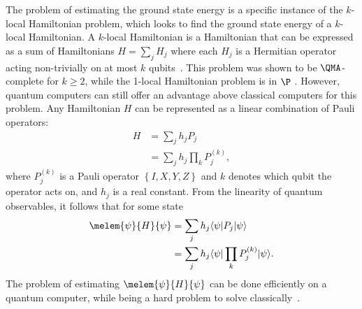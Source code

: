 The problem of estimating the ground state energy is a specific instance of the $k$-local Hamiltonian problem, which looks to find the ground state energy of a $k$-local Hamiltonian.
A $k$-local Hamiltonian is a Hamiltonian that can be expressed as a sum of Hamiltonians $H = \sum_{j}H_j$ where each $H_j$ is a Hermitian operator acting non-trivially on at most $k$ qubits~\cite{bookatz2012qma}.
This problem was shown to be $\QMA$-complete for $k \geq 2$, while the 1-local Hamiltonian problem is in $\P$ \cite{kempe2006complexity}.
However, quantum computers can still offer an advantage above classical computers for this problem.
Any Hamiltonian $H$ can be represented as a linear combination of Pauli operators:
\begin{align}
H &= \sum_j h_j P_j \\
  &= \sum_j h_j \prod_k P_j^{(k)},
\end{align} 
where $P_j^{(k)}$ is a Pauli operator $\left\{I, X, Y, Z\right\}$ and $k$ denotes which qubit the operator acts on, and $h_j$ is a real constant.
From the linearity of quantum observables, it follows that for some state \ket{\psi}
\begin{align}
\melem{\psi}{H}{\psi} &= \sum_j h_j \bra{\psi}P_j\ket{\psi} \\
&= \sum_j h_j \bra{\psi}\prod_k P_j^{(k)}\ket{\psi}.
\end{align} 
The problem of estimating $\melem{\psi}{H}{\psi}$ can be done efficiently on a quantum computer, while being a hard problem to solve classically~\cite{ortiz2001quantum, peruzzo2014variational, kandala2017hardware}.

